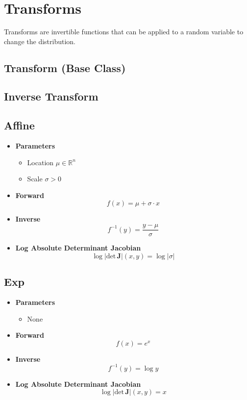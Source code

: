 \section{Transforms}

Transforms are invertible functions that can be applied to a
random variable to change the distribution.
\subsection{Transform (Base Class)}
\subsection{Inverse Transform}
\subsection{Affine}
\begin{itemize}
  \item \textbf{Parameters}
  \begin{itemize}
    \item Location $\mu \in \mathbb{R}^n$
    \item Scale $\sigma > 0$
  \end{itemize}
  \item \textbf{Forward}
  \begin{equation}
    f(x) = \mu + \sigma \cdot x
  \end{equation}
  \item \textbf{Inverse}
  \begin{equation}
    f^{-1}(y) = \frac{y - \mu}{\sigma}
  \end{equation}
  \item \textbf{Log Absolute Determinant Jacobian}
  \begin{equation}
    \log \vert \text{det} \, \mathbf{J} \vert (x, y) = \log \vert \sigma \vert
  \end{equation}
\end{itemize}

\subsection{Exp}
\begin{itemize}
  \item \textbf{Parameters}
  \begin{itemize}
    \item None
  \end{itemize}
  \item \textbf{Forward}
  \begin{equation}
    f(x) = e^x
  \end{equation}
  \item \textbf{Inverse}
  \begin{equation}
    f^{-1}(y) = \log y
  \end{equation}
  \item \textbf{Log Absolute Determinant Jacobian}
  \begin{equation}
    \log \vert \text{det} \, \mathbf{J} \vert (x, y) = x
  \end{equation}
\end{itemize}

